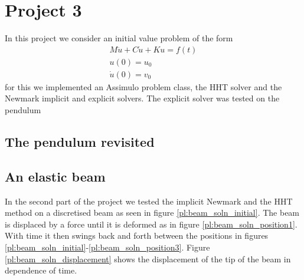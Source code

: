 \documentclass{report}
\begin{document}
\chapter*{Project 3}

In this project we consider an initial value problem of the form
\begin{align*}
	M \ddot{u}+C\dot{u}+Ku = f(t) \\
	u(0) = u_0 \\
	\dot{u}(0) = v_0
\end{align*}
for this we implemented an Assimulo problem class, the HHT solver and the Newmark implicit and explicit solvers. The explicit solver was tested on the pendulum 

\section*{The pendulum revisited}

\section*{An elastic beam}

In the second part of the project we tested the implicit Newmark and the HHT method on a discretised beam as seen in figure \ref{pl:beam_soln_initial}. The beam is displaced by a force until it is deformed as in figure \ref{pl:beam_soln_position1}. With time it then swings back and forth between the positions in figures \ref{pl:beam_soln_initial}-\ref{pl:beam_soln_position3}. Figure \ref{pl:beam_soln_displacement} shows the displacement of the tip of the beam in dependence of time.
\end{document}
